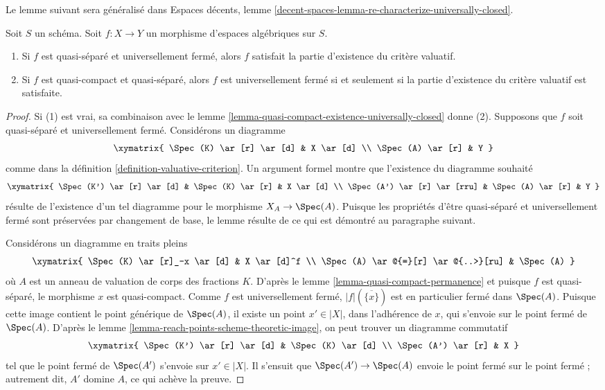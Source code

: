 \noindent
Le lemme suivant sera généralisé dans Espaces décents, lemme
\ref{decent-spaces-lemma-re-characterize-universally-closed}.

\begin{lemma}
\label{lemma-characterize-universally-closed-quasi-separated}
Soit $S$ un schéma. Soit $f : X \to Y$ un
morphisme d'espaces algébriques sur $S$.
\begin{enumerate}
\item Si $f$ est quasi-séparé et universellement fermé, alors
$f$ satisfait la partie d'existence du critère valuatif.
\item Si $f$ est quasi-compact et quasi-séparé, alors
$f$ est universellement fermé si et seulement si la partie d'existence du
critère valuatif est satisfaite.
\end{enumerate}
\end{lemma}

\begin{proof}
Si (1) est vrai, sa combinaison avec le
lemme \ref{lemma-quasi-compact-existence-universally-closed}
donne (2). Supposons que $f$ soit quasi-séparé et universellement fermé.
Considérons un diagramme
$$
\xymatrix{
\Spec(K) \ar[r] \ar[d] & X \ar[d] \\
\Spec(A) \ar[r] & Y
}
$$
comme dans la définition \ref{definition-valuative-criterion}.
Un argument formel montre que l'existence du diagramme souhaité
$$
\xymatrix{
\Spec(K') \ar[r] \ar[d] & \Spec(K) \ar[r] & X \ar[d] \\
\Spec(A') \ar[r] \ar[rru] & \Spec(A) \ar[r] & Y
}
$$
résulte de l'existence d'un tel diagramme pour le morphisme $X_A \to \Spec(A)$.
Puisque les propriétés d'être quasi-séparé et universellement fermé sont préservées
par changement de base, le lemme résulte de ce qui est démontré au paragraphe suivant.

\medskip\noindent
Considérons un diagramme en traits pleins
$$
\xymatrix{
\Spec(K) \ar[r]_-x \ar[d] & X \ar[d]^f \\
\Spec(A) \ar@{=}[r] \ar@{..>}[ru] & \Spec(A)
}
$$
où $A$ est un anneau de valuation de corps des fractions $K$.
D'après le lemme \ref{lemma-quasi-compact-permanence} et puisque
$f$ est quasi-séparé, le
morphisme $x$ est quasi-compact.
Comme $f$ est universellement fermé,
$|f|(\overline{\{x\}})$ est en particulier fermé dans $\Spec(A)$.
Puisque cette image contient le point générique de $\Spec(A)$,
il existe un point $x' \in |X|$, dans l'adhérence
de $x$, qui s'envoie sur le point fermé de $\Spec(A)$.
D'après le lemme \ref{lemma-reach-points-scheme-theoretic-image},
on peut trouver un diagramme commutatif
$$
\xymatrix{
\Spec(K') \ar[r] \ar[d] & \Spec(K) \ar[d] \\
\Spec(A') \ar[r] & X
}
$$
tel que le point fermé de $\Spec(A')$ s'envoie sur $x' \in |X|$.
Il s'ensuit que $\Spec(A') \to \Spec(A)$ envoie le point fermé
sur le point fermé ; autrement dit, $A'$ domine $A$, ce qui achève la preuve.
\end{proof}

